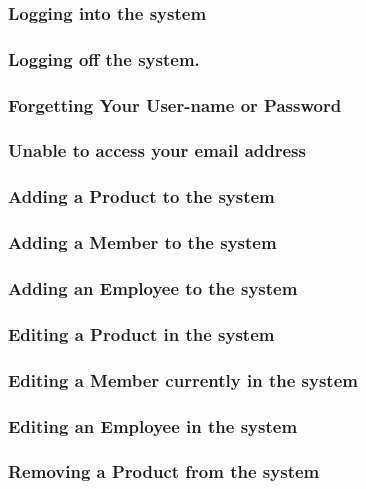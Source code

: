 \subsubsection{Logging into the system}

\subsubsection{Logging off the system.}

\subsubsection{Forgetting Your User-name or Password}

\subsubsection{Unable to access your email address}

\subsubsection{Adding a Product to the system}

\subsubsection{Adding a Member to the system}

\subsubsection{Adding an Employee to the system}

\subsubsection{Editing a Product in the system}

\subsubsection{Editing a Member currently in the system}

\subsubsection{Editing an Employee in the system}

\subsubsection{Removing a Product from the system}

